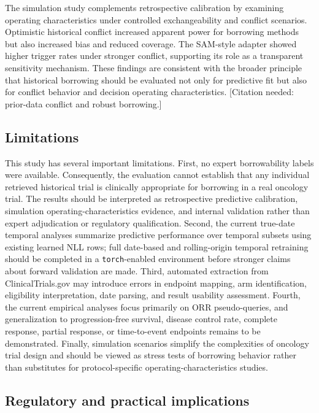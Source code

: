 \documentclass[11pt]{article}
\begin{document}
The simulation study complements retrospective calibration by examining operating characteristics under controlled exchangeability and conflict scenarios. Optimistic historical conflict increased apparent power for borrowing methods but also increased bias and reduced coverage. The SAM-style adapter showed higher trigger rates under stronger conflict, supporting its role as a transparent sensitivity mechanism. These findings are consistent with the broader principle that historical borrowing should be evaluated not only for predictive fit but also for conflict behavior and decision operating characteristics. [Citation needed: prior-data conflict and robust borrowing.]

\subsection{Limitations}

This study has several important limitations. First, no expert borrowability labels were available. Consequently, the evaluation cannot establish that any individual retrieved historical trial is clinically appropriate for borrowing in a real oncology trial. The results should be interpreted as retrospective predictive calibration, simulation operating-characteristics evidence, and internal validation rather than expert adjudication or regulatory qualification. Second, the current true-date temporal analyses summarize predictive performance over temporal subsets using existing learned NLL rows; full date-based and rolling-origin temporal retraining should be completed in a \texttt{torch}-enabled environment before stronger claims about forward validation are made. Third, automated extraction from ClinicalTrials.gov may introduce errors in endpoint mapping, arm identification, eligibility interpretation, date parsing, and result usability assessment. Fourth, the current empirical analyses focus primarily on ORR pseudo-queries, and generalization to progression-free survival, disease control rate, complete response, partial response, or time-to-event endpoints remains to be demonstrated. Finally, simulation scenarios simplify the complexities of oncology trial design and should be viewed as stress tests of borrowing behavior rather than substitutes for protocol-specific operating-characteristics studies.

\subsection{Regulatory and practical implications}
\end{document}

